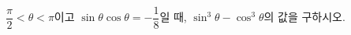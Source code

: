$\dfrac{\pi}{2}<\theta<\pi$이고 $\sin\theta\cos\theta=-\dfrac{1}{8}$일 때, $\sin^3\theta-\cos^3\theta$의 값을 구하시오.
